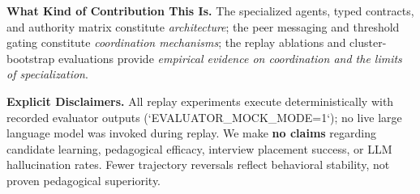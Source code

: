 \noindent\textbf{What Kind of Contribution This Is.} The specialized agents, typed contracts, and authority matrix constitute \emph{architecture}; the peer messaging and threshold gating constitute \emph{coordination mechanisms}; the replay ablations and cluster-bootstrap evaluations provide \emph{empirical evidence on coordination and the limits of specialization}.

\noindent\textbf{Explicit Disclaimers.} All replay experiments execute deterministically with recorded evaluator outputs (`EVALUATOR\_MOCK\_MODE=1`); no live large language model was invoked during replay. We make \textbf{no claims} regarding candidate learning, pedagogical efficacy, interview placement success, or LLM hallucination rates. Fewer trajectory reversals reflect behavioral stability, not proven pedagogical superiority.

